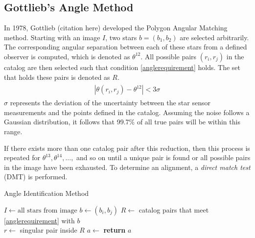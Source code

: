 \subsection{Gottlieb's Angle Method}
In 1978, Gottlieb (citation here) developed the Polygon Angular Matching method. Starting with an image $I$, two stars $b = (b_1, b_2)$ are selected arbitrarily. The corresponding angular separation between each of these stars from a defined observer is computed, which is denoted as $\theta^{12}$. All possible pairs $(r_i, r_j)$ in the catalog are then selected such that condition \eqref{anglerequirement} holds. The set that holds these pairs is denoted as $R$. 
\begin{align}
\label{anglerequirement}
\begin{split}
| \theta(r_i, r_j) - \theta^{12} | < 3 \sigma
\end{split}
\end{align}
$\sigma$ represents the deviation of the uncertainty between the star sensor measurements and the points defined in the catalog. Assuming the noise follows a Gaussian distribution, it follows that 99.7\% of all true pairs will be within this range.

If there exists more than one catalog pair after this reduction, then this process is repeated for $\theta^{13}, \theta^{14}, ...,$ and so on until a unique pair is found or all possible pairs in the image have been exhausted. To determine an alignment, a \textit{direct match test} (DMT) is performed.


\begin{algorithm}
\caption{Angle Identification Method}
\label{Angle Candidate}
\begin{algorithmic}[1]

\State $I \gets \text{all stars} \text{ from image}$
\State $b \gets (b_i, b_j)$
\State $R \gets $ catalog pairs that meet \eqref{anglerequirement} with $b$
\\
\State $r \gets $ singular pair inside $R$
\State $a \gets $ 
\State \textbf{return} $a$
\EndIf
\EndFor
\EndFor
\EndProcedure
\end{algorithmic}
\end{algorithm}

